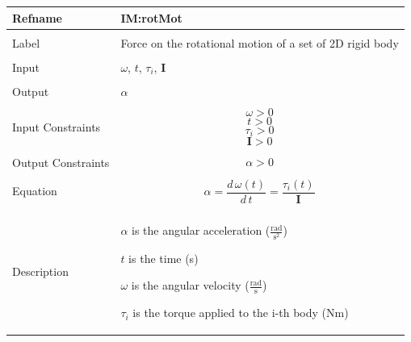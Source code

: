 \documentclass[12pt]{article}
\begin{document}
\noindent \begin{minipage}{\textwidth}
\begin{tabular}{p{} p{}}
\toprule \textbf{Refname} & \textbf{IM:rotMot}
\label{IM:rotMot}
\\ \midrule \\
Label & Force on the rotational motion of a set of 2D rigid body
\\ \midrule \\
Input & $ω$, $t$, ${τ_{i}}$, $\mathbf{I}$
\\ \midrule \\
Output & $α$
\\ \midrule \\
Input Constraints & \begin{dmath}
                    ω>0
                    \end{dmath}
                    \begin{dmath}
                    t>0
                    \end{dmath}
                    \begin{dmath}
                    {τ_{i}}>0
                    \end{dmath}
                    \begin{dmath}
                    \mathbf{I}>0
                    \end{dmath}
\\ \midrule \\
Output Constraints & \begin{dmath}
                     α>0
                     \end{dmath}
\\ \midrule \\
Equation & \begin{dmath}
           α=\frac{d\,ω\left(t\right)}{d\,t}=\frac{{τ_{i}}\left(t\right)}{\mathbf{I}}
           \end{dmath}
\\ \midrule \\
Description & \begin{symbDescription}
              \item{$α$ is the angular acceleration ($\frac{\text{rad}}{\text{s}^{2}}$)}
              \item{$t$ is the time (s)}
              \item{$ω$ is the angular velocity ($\frac{\text{rad}}{\text{s}}$)}
              \item{${τ_{i}}$ is the torque applied to the i-th body (Nm)}

\end{symbDescription}
\end{tabular}
\end{minipage}
\end{document}

